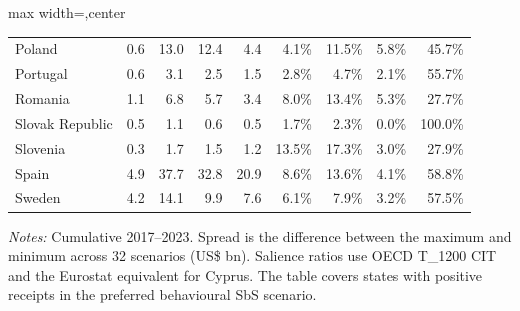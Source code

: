 \begin{table}[H]
\begin{adjustbox}{max width=\textwidth,center}
\begin{tabular}{@{}l rrr r rrrr@{}}
Poland & 0.6 & 13.0 & 12.4 & 4.4 & 4.1\% & 11.5\% & 5.8\% & 45.7\% \\
Portugal & 0.6 & 3.1 & 2.5 & 1.5 & 2.8\% & 4.7\% & 2.1\% & 55.7\% \\
Romania & 1.1 & 6.8 & 5.7 & 3.4 & 8.0\% & 13.4\% & 5.3\% & 27.7\% \\
Slovak Republic & 0.5 & 1.1 & 0.6 & 0.5 & 1.7\% & 2.3\% & 0.0\% & 100.0\% \\
Slovenia & 0.3 & 1.7 & 1.5 & 1.2 & 13.5\% & 17.3\% & 3.0\% & 27.9\% \\
Spain & 4.9 & 37.7 & 32.8 & 20.9 & 8.6\% & 13.6\% & 4.1\% & 58.8\% \\
Sweden & 4.2 & 14.1 & 9.9 & 7.6 & 6.1\% & 7.9\% & 3.2\% & 57.5\% \\
\bottomrule
\end{tabular}
\end{adjustbox}

\vspace{0.35em}
\noindent\begin{minipage}{\textwidth}
\footnotesize\raggedright\textit{Notes:} Cumulative 2017–2023. Spread is the difference between the maximum and minimum across 32 scenarios (US\$ bn). Salience ratios use OECD T\_1200 CIT and the Eurostat equivalent for Cyprus. The table covers states with positive receipts in the preferred behavioural SbS scenario.
\end{minipage}
\end{table}
